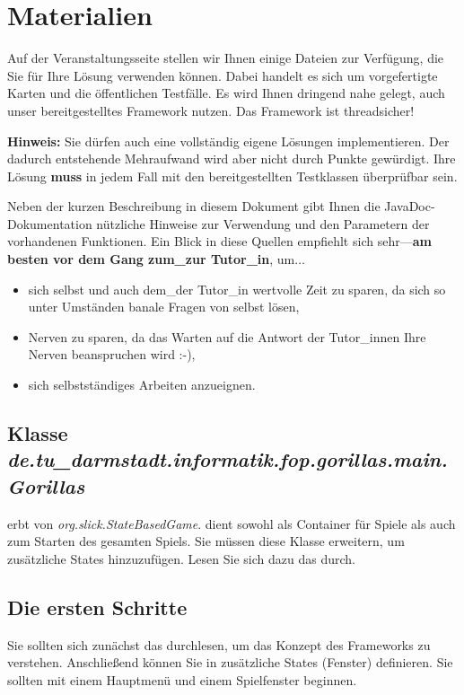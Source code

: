 \section{Materialien}

Auf der Veranstaltungsseite stellen wir Ihnen einige Dateien zur Verf\"ugung, die Sie f\"ur Ihre L\"osung verwenden k\"onnen. Dabei handelt es sich um vorgefertigte Karten und
die \"offentlichen Testf\"alle. Es wird Ihnen dringend nahe gelegt, auch unser bereitgestelltes Framework nutzen. Das Framework ist threadsicher!

\textbf{Hinweis:} Sie dürfen auch eine vollst\"andig eigene L\"osungen implementieren. Der dadurch entstehende Mehraufwand wird aber nicht durch Punkte gewürdigt. Ihre L\"osung \textbf{muss} in jedem Fall mit den bereitgestellten Testklassen \"uberpr\"ufbar sein.

Neben der kurzen Beschreibung in diesem Dokument gibt Ihnen die
JavaDoc-Dokumentation n\"utzliche Hinweise zur Verwendung und den
Parametern der vorhandenen Funktionen. Ein Blick in diese Quellen empfiehlt sich
sehr---\textbf{am besten vor dem Gang zum\_zur Tutor\_in}, um$\ldots$

\begin{itemize}
\item sich selbst und auch dem\_der Tutor\_in wertvolle Zeit zu sparen, da sich so unter Umst\"anden banale Fragen von selbst l\"osen,

\item Nerven zu sparen, da das Warten auf die Antwort der Tutor\_innen Ihre Nerven beanspruchen wird :-),

\item sich selbstst\"andiges Arbeiten anzueignen.
\end{itemize} 


\subsection{Klasse \emph{de.tu\_darmstadt.informatik.fop.gorillas.main.Gorillas}}

\textit{\gameTitle} erbt von \textit{org.slick.StateBasedGame}. \textit{\gameTitle} dient sowohl als Container für Spiele 
als auch zum Starten des gesamten Spiels. Sie müssen diese Klasse erweitern, um zusätzliche States hinzuzufügen. Lesen Sie sich dazu das \tutorialURL durch.

\subsection {Die ersten Schritte}
Sie sollten sich zunächst das  \tutorialURL 
durchlesen, um das Konzept des Frameworks zu verstehen. Anschließend können Sie in \texttt{\gameTitle} zusätzliche 
States (Fenster) definieren. Sie sollten mit einem Hauptmenü und einem Spielfenster beginnen.

